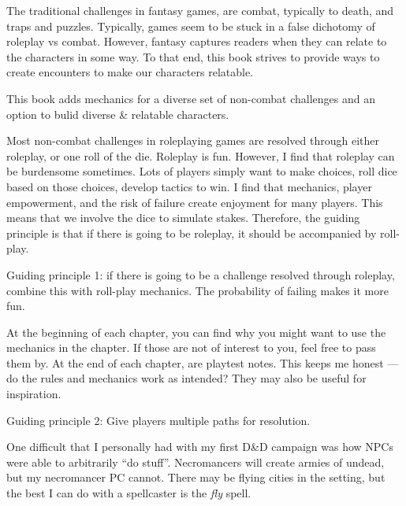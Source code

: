 \documentclass[twocolumn]{dndbook}
\begin{document}
The traditional challenges in fantasy games, are combat, typically to death, and traps and puzzles.
Typically, games seem to be stuck in a false dichotomy of roleplay vs combat.
However, fantasy captures readers when they can relate to the characters in some way.
To that end, this book strives to provide ways to create encounters to make our characters relatable.\par

\begin{emphasisParagraph}
This book adds mechanics for a diverse set of non-combat challenges and an option to bulid diverse \& relatable characters.
\end{emphasisParagraph}

Most non-combat challenges in roleplaying games are resolved through either roleplay, or one roll of the die.
Roleplay is fun. However, I find that roleplay can be burdensome sometimes.
Lots of players simply want to make choices, roll dice based on those choices, develop tactics to win.
I find that mechanics, player empowerment, and the risk of failure create enjoyment for many players.
This means that we involve the dice to simulate stakes.
Therefore, the guiding principle is that if there is going to be roleplay, it should be accompanied by roll-play.\par

\begin{emphasisParagraph}
	Guiding principle 1: if there is going to be a challenge resolved through roleplay, combine this with roll-play mechanics.
	The probability of failing makes it more fun.
\end{emphasisParagraph}

At the beginning of each chapter, you can find why you might want to use the mechanics in the chapter.
If those are not of interest to you, feel free to pass them by.
At the end of each chapter, are playtest notes.
This keeps me honest --- do the rules and mechanics work as intended?
They may also be useful for inspiration.\par

\begin{emphasisParagraph}
	Guiding principle 2: Give players multiple paths for resolution.
\end{emphasisParagraph}

One difficult that I personally had with my first D\&D campaign was how NPCs were able to arbitrarily ``do stuff''.
Necromancers will create armies of undead, but my necromancer PC cannot.
There may be flying cities in the setting, but the best I can do with a spellcaster is the \emph{fly} spell.
\end{document}
